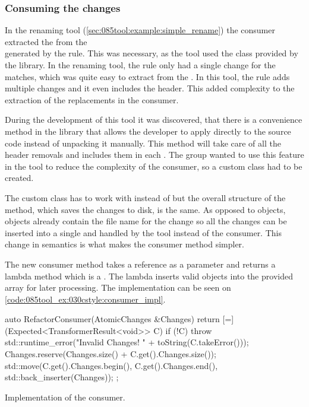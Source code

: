 \subsubsection*{Consuming the changes}

In the renaming tool (\cref{sec:085tool:example:simple_rename}) the  consumer extracted the  from the\\
 generated by the rule. This was necessary, as the tool used the  class provided by the library. In the renaming tool, the rule only had a single change for the matches, which was quite easy to extract from the . In this tool, the rule adds multiple changes and it even includes the  header. This added complexity to the extraction of the replacements in the consumer. 

During the development of this tool it was discovered, that there is a convenience method in the library that allows the developer to apply  directly to the source code instead of unpacking it manually. This method will take care of all the header removals and includes them in each . The group wanted to use this feature in the tool to reduce the complexity of the consumer, so a custom  class had to be created.

The custom class has to work with  instead of  but the overall structure of the  method, which saves the changes to disk, is the same. As opposed to  objects, objects already contain the file name for the change so all the changes can be inserted into a single  and handled by the tool instead of the consumer. This change in semantics is what makes the consumer method simpler. 

The new consumer method takes a  reference as a parameter and returns a lambda method which is a . The lambda inserts valid  objects into the provided  array for later processing. The implementation can be seen on \cref{code:085tool_ex:030cstyle:consumer_impl}.

\begin{listing}[H]
    \begin{cppcode}
auto RefactorConsumer(AtomicChanges &Changes) {
        return [=](Expected<TransformerResult<void>> C) {
            if (!C) {
                throw std::runtime_error("Invalid Changes! " + toString(C.takeError()));
            }
            Changes.reserve(Changes.size() + C.get().Changes.size());
            std::move(C.get().Changes.begin(), C.get().Changes.end(), std::back_inserter(Changes));
        };
}
    \end{cppcode}
    \caption{Implementation of the  consumer.}
    \label{code:085tool_ex:030cstyle:consumer_impl}
\end{listing}

